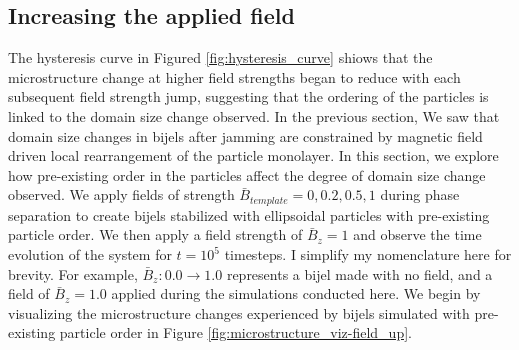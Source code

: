 \subsection{Increasing the applied
field}\label{increasing-the-applied-field}

The hysteresis curve in Figured \ref{fig:hysteresis_curve} shiows that the microstructure change at higher
field strengths began to reduce with each subsequent field strength
jump, suggesting that the ordering of the particles is linked to the
domain size change observed. In the previous section, We saw that domain
size changes in bijels after jamming are constrained by magnetic field
driven local rearrangement of the particle monolayer. In this section,
we explore how pre-existing order in the particles affect the degree of
domain size change observed. We apply fields of strength
$\bar{B}_{template} = 0, 0.2, 0.5, 1$ during phase separation to
create bijels stabilized with ellipsoidal particles with pre-existing
particle order. We then apply a field strength of $\bar{B}_z = 1$ and
observe the time evolution of the system for $t = 10^5$ timesteps. I
simplify my nomenclature here for brevity. For example,
$\bar{B}_z: 0.0 \rightarrow 1.0$ represents a bijel made with no
field, and a field of $\bar{B}_z = 1.0$ applied during the simulations conducted here. 
We begin by visualizing the microstructure
changes experienced by bijels simulated with pre-existing particle order
in Figure \ref{fig:microstructure_viz-field_up}.


